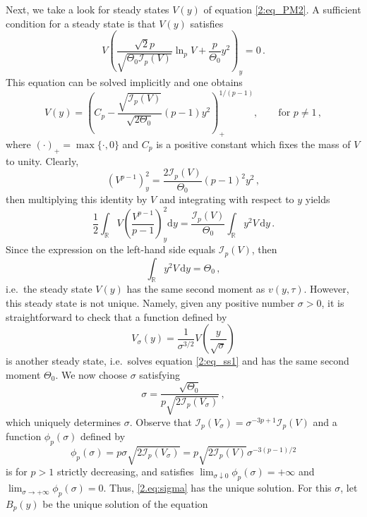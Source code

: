 \documentclass[12pt]{amsart}
\newcommand{\R}{{\mathbb R}}
\newcommand{\dd}{{\mathrm{d}}}
\newcommand{\M}{\Theta}
\newcommand{\I}{\mathcal{I}}
\theoremstyle{plain}
\theoremstyle{definition}
\theoremstyle{remark}
\begin{document}
Next, we take a look for steady states $V(y)$ of equation \eqref{2:eq_PM2}. A sufficient condition for a steady state is that $V(y)$ satisfies
\begin{equation}\label{2:eq_ss1}
    V\left(\frac{\sqrt{2}p}{\sqrt{\M_0\I_p(V)}}\ln_pV + \frac{p}{\M_0}y^2\right)_y = 0\,.
\end{equation}
This equation can be solved implicitly and one obtains
\begin{equation*}
    V(y) = \left(C_p - \frac{\sqrt{\I_p(V)}}{\sqrt{2\M_0}}(p-1)y^2\right)_+^{1/(p-1)},\qquad\text{for }p\ne1\,,
\end{equation*}
where $(\cdot)_+ = \max\{\cdot,0\}$ and $C_p$ is a positive constant which fixes the mass of $V$ to unity. Clearly,
\begin{equation*}
    \left(V^{p-1}\right)_y^2 = \frac{2\I_p(V)}{\M_0}(p-1)^2y^2\,,
\end{equation*}
then multiplying this identity by $V$ and integrating with respect to $y$ yields
\begin{equation*}
    \frac{1}{2}\int_{\R}V\left(\frac{V^{p-1}}{p-1}\right)_y^2\dd y = \frac{\I_p(V)}{\M_0}\int_{\R}y^2 V\,\dd y\,.
\end{equation*}
Since the expression on the left-hand side equals $\I_p(V)$, then
\begin{equation*}
    \int_{\R}y^2 V\,\dd y = \M_0\,,
\end{equation*}
i.e.~the steady state $V(y)$ has the same second moment as $v(y,\tau)$.
However, this steady state is not unique. Namely, given any positive number $\sigma>0$, it is straightforward to check that a function defined by 
\begin{equation*}
    V_\sigma(y) = \frac{1}{\sigma^{3/2}}V\left(\frac{y}{\sqrt{\sigma}}\right)
\end{equation*}
is another steady state, i.e.~solves equation \eqref{2:eq_ss1} and has the same second moment $\M_0$. We now choose $\sigma$ satisfying
\begin{equation}
    \label{2.eq:sigma}
    \sigma = \frac{\sqrt{\M_0}}{p\sqrt{2\I_p(V_\sigma)}}\,,
\end{equation}
which uniquely determines $\sigma$.
Observe that $\I_p(V_\sigma) = \sigma^{-3p+1}\I_p(V)$ and a function $\phi_p(\sigma)$ defined by 
\begin{equation*}
    \phi_p(\sigma) = p\sigma\sqrt{2\I_p(V_\sigma)} = p\sqrt{2\I_p(V)} \sigma^{-3(p-1)/2}
\end{equation*}
is for $p>1$ strictly decreasing, and satisfies  $\lim_{\sigma\downarrow0}\phi_p(\sigma) = +\infty$ and $\lim_{\sigma\to+\infty}\phi_p(\sigma) = 0$. Thus, \eqref{2.eq:sigma} has the unique solution. For this $\sigma$, let $B_p(y)$ be the unique solution of the equation
\end{document}

